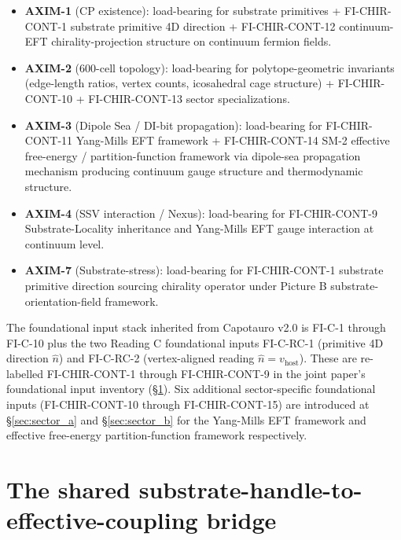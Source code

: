 \documentclass[11pt,letterpaper]{article}
\begin{document}
\begin{itemize}[leftmargin=*]
\item \textbf{AXIM-1} (CP existence): load-bearing for substrate primitives + FI-CHIR-CONT-1 substrate primitive 4D direction + FI-CHIR-CONT-12 continuum-EFT chirality-projection structure on continuum fermion fields.
\item \textbf{AXIM-2} (600-cell topology): load-bearing for polytope-geometric invariants (edge-length ratios, vertex counts, icosahedral cage structure) + FI-CHIR-CONT-10 + FI-CHIR-CONT-13 sector specializations.
\item \textbf{AXIM-3} (Dipole Sea / DI-bit propagation): load-bearing for FI-CHIR-CONT-11 Yang-Mills EFT framework + FI-CHIR-CONT-14 SM-2 effective free-energy / partition-function framework via dipole-sea propagation mechanism producing continuum gauge structure and thermodynamic structure.
\item \textbf{AXIM-4} (SSV interaction / Nexus): load-bearing for FI-CHIR-CONT-9 Substrate-Locality inheritance and Yang-Mills EFT gauge interaction at continuum level.
\item \textbf{AXIM-7} (Substrate-stress): load-bearing for FI-CHIR-CONT-1 substrate primitive direction sourcing chirality operator under Picture B substrate-orientation-field framework.
\end{itemize}

The foundational input stack inherited from Capotauro v2.0 is FI-C-1 through FI-C-10 \cite{Capotauro} plus the two Reading C foundational inputs FI-C-RC-1 (primitive 4D direction $\hat{n}$) and FI-C-RC-2 (vertex-aligned reading $\hat{n} = v_{\text{host}}$). These are re-labelled FI-CHIR-CONT-1 through FI-CHIR-CONT-9 in the joint paper's foundational input inventory (§\ref{sec:bridge}). Six additional sector-specific foundational inputs (FI-CHIR-CONT-10 through FI-CHIR-CONT-15) are introduced at §\ref{sec:sector_a} and §\ref{sec:sector_b} for the Yang-Mills EFT framework and effective free-energy partition-function framework respectively.

\section{The shared substrate-handle-to-effective-coupling bridge}
\label{sec:bridge}
\end{document}
